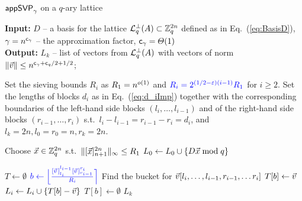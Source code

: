 \begin{algorithm}[t]
	\caption{$\textsf{appSVP}_{\gamma}$ on a $q$-ary lattice}
	\label{alg:ApproxSVPImprived}
	\textbf{Input:} $D$ -- a basis for the lattice $\mathcal{L}_q^{\perp}(A) \subset {{\mathbb Z}}_q^{2n}$ defined as in Eq.~(\ref{eq:BasisD}), $\gamma = n^{\mathsf{c}_{\gamma}}$ -- the approximation factor, $\mathsf{c}_{\gamma}=\varTheta(1)$ \\
	\textbf{Output:} $L_k$ -- list of vectors from $\mathcal{L}_q^{\perp}(A)$ with vectors of norm $\| \vvec \| \leq n^{\cg+\cq/2+1/2}$;
	
	\begin{algorithmic}[1]
		
		\State Set the sieving bounds $R_i$ as $R_1 = n^{o(1)}$ and ${\color{blue}R_i = 2^{(1/2-\varepsilon)(i-1)} R_1}$ for $i \geq 2$.
		\State Set the lengths of blocks $d_i$ as in Eq.~(\ref{eq:d_iImp}) together with the corresponding boundaries of the {\color{blue}left-hand side} blocks $(l_i, \ldots, l_{i-1})$ and of the {\color{blue}right-hand side} blocks $(r_{i-1}, \ldots, r_i)$ s.t.\ $l_{i}-{l_{i-1}} = r_{i-1} -r_i  = d_i$, and $l_k = 2n, l_0 = r_0 = n, r_k = 2n$.
		
		\Repeat {}
		\State Choose $\vec x \in {{\mathbb Z}}_q^{2n}$ s.t.\ $\| [\vec x]_{n+1}^{2n} \|_{\infty} \leq R_1$
		\State $L_0 \gets L_0 \mathbin{\cup} \{D\vec x \bmod q\} $
		
		\State $T \gets \emptyset$ 
		\State ${\color{blue} b \gets \Big\lfloor \frac{[\vvec\mkern2mu]_{l_i}^{l_{i-1}} [\vvec\mkern2mu]_{r_{i-1}}^{r_i}}{R_i} \Big\rceil}$ \Comment Find the bucket for $\vvec[l_i, \ldots, l_{i-1}, r_{i-1}, \ldots r_i]$
		\State $T[b] \gets \vvec$
		\Else
		\State $L_{i} \gets L_{i} \union \{T[b] - \vvec \}$
		\State $T[b] \gets \emptyset$
		\EndIf
		\EndFor
		\EndFor
		\State \Return $L_k$
	\end{algorithmic}
\end{algorithm}
